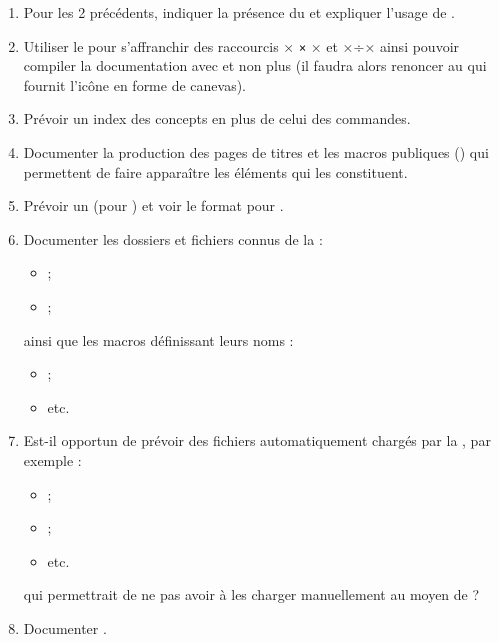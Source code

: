 \begin{enumerate}
\item Pour les 2 précédents, indiquer la présence du  et
  expliquer l'usage de .
\item Utiliser le  pour s'affranchir des raccourcis
  \lstDeleteShortInline×%
  \lstinline|×|
  \lstMakeShortInline[style=dbtex]×%
  et ×÷× ainsi pouvoir compiler la documentation avec  et non
  plus  (il faudra alors renoncer au 
  qui fournit l'icône en forme de canevas).
\item Prévoir un index des concepts en plus de celui des commandes.
\item Documenter la production des pages de titres et les macros publiques
  () qui permettent de faire apparaître les éléments qui
  les constituent.
\item Prévoir un  (pour ) et voir le format
  pour .
\item Documenter les dossiers et fichiers connus de la \yatcl{} :
  \begin{itemize}
  \item \directory{\configurationdirectory} ;
  \item \file{\configurationfile} ;
  \end{itemize}
  ainsi que les macros définissant leurs noms :
  \begin{itemize}
  \item {} ;
  \item etc.
  \end{itemize}
\item Est-il opportun de prévoir des fichiers automatiquement chargés par la
  \yatcl{}, par exemple :
  \begin{itemize}
  \item \file{\acronymsfile} ;
  \item {} ;
  \item etc.
  \end{itemize}
  qui permettrait de ne pas avoir à les charger manuellement au moyen de
   ?
\item Documenter .
\end{enumerate}

%
\iffalse
\fi
